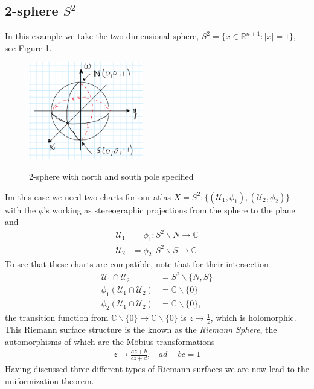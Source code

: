 \documentclass[lettersize,11pt]{article}
\begin{document}
\subsection{2-sphere $S^2$}
In this example we take the two-dimensional sphere, $S^2=\{x\in \mathds{R}^{n+1}: |x|=1\}$, see Figure \ref{fig:spher}.
\begin{figure}[H] \centering
\includegraphics[width=5cm]{7}  \label{fig:spher} \caption{2-sphere with north and south pole specified}
\end{figure}
Im this case we need two charts for our atlas $X=S^2:\{(\mathcal{U}_1,\phi_1),(\mathcal{U}_2,\phi_2)\}$
with the $\phi$'s working as stereographic projections from the sphere to the plane and
\begin{equation}
	\begin{aligned}
		\mathcal{U}_1&=\phi_1: S^2\backslash N\to \mathds{C} \\
		\mathcal{U}_2&=\phi_2: S^2\backslash S\to \mathds{C}
	\end{aligned}
\end{equation}
To see that these charts are compatible, note that for their intersection
	\begin{equation}
	\begin{aligned}
		\mathcal{U}_{1}\cap \mathcal{U}_{2}&=S^2\backslash\{N,S\}\\
		\phi_1(\mathcal{U}_{1}\cap \mathcal{U}_{2})&=\mathds{C}\backslash\{0\}\\
		\phi_2(\mathcal{U}_{1}\cap \mathcal{U}_{2})&=\mathds{C}\backslash\{0\},
	\end{aligned}
\end{equation}
the transition function from $\mathds{C}\backslash\{0\}\to \mathds{C}\backslash\{0\}$ is $z\to \frac{1}{z}$, which is holomorphic. This Riemann surface structure is the known as the \textit{Riemann Sphere}, the automorphisms of which are the Möbius transformations
\begin{equation}
	\begin{aligned}
		z\to \frac{az+b}{cz+d},~~~~ad-bc=1
	\end{aligned}
\end{equation} 
Having discussed three different types of Riemann surfaces we are now lead to the uniformization theorem.
\end{document}

